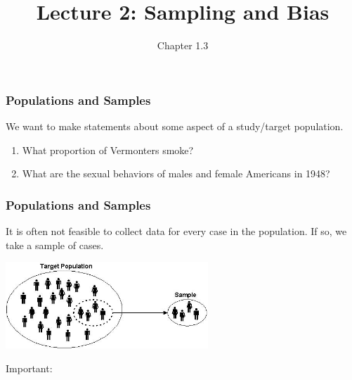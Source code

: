 \documentclass[handout]{beamer}
\title{Lecture 2: Sampling and Bias}
\author{Chapter 1.3}
\date{}
\newcommand{\blue}[1]{\textcolor{blue2}{#1}}
\begin{document}
\begin{frame}
\titlepage
\end{frame}



\begin{frame}
\frametitle{Populations and Samples}
We want to make statements about some aspect of a \blue{study/target population}.

\begin{enumerate}
\item What proportion of Vermonters smoke?
\item What are the sexual behaviors of males and female Americans in 1948?
\end{enumerate}

\end{frame}


\begin{frame}
\frametitle{Populations and Samples}

It is often not feasible to collect data for every case in the population.  If so, we take a \blue{sample} of cases.

\begin{center}
\pause\includegraphics[width=3in]{./figure/target-population.jpg}
\end{center}

\pause

Important:
%
%

\end{frame}
\end{document}
